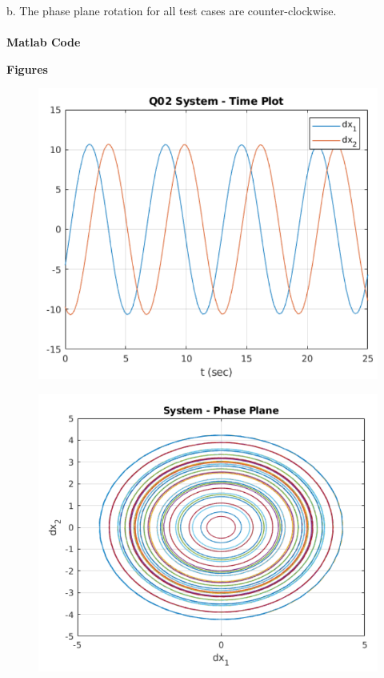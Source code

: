 \documentclass{homeworg}
\begin{document}
\newpage
b. The phase plane rotation for all test cases are counter-clockwise.\\ \\
\textbf{Matlab Code}

\newpage
\noindent
\textbf{Figures}\\
\begin{figure}[h]
  \includegraphics[width=.6\textwidth]{fig005.png}
  \centering
\end{figure}
\begin{figure}[h]
  \includegraphics[width=.6\textwidth]{fig006.png}
  \centering
\end{figure}

%
\end{document}
